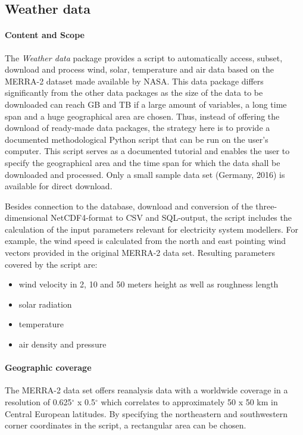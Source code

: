 \documentclass[article,sort&compress]{elsarticle}
\begin{document}
\subsection{Weather data}

\paragraph{Content and Scope}
The \textit{Weather data} package provides a script to automatically access, subset, download and process wind, solar, temperature and air data based on the MERRA-2 dataset \cite{Merra2,Rienecker2011} made available by NASA. This data package differs significantly from the other data packages as the size of the data to be downloaded can reach GB and TB if a large amount of variables, a long time span and a huge geographical area are chosen. Thus, instead of offering the download of ready-made data packages, the strategy here is to provide a documented methodological Python script that can be run on the user's computer. This script serves as a documented tutorial and enables the user to specify the geographical area and the time span for which the data shall be downloaded and processed. Only a small sample data set (Germany, 2016) is available for direct download.

Besides connection to the database, download and conversion of the three-dimensional NetCDF4-format to CSV and SQL-output, the script includes the calculation of the input parameters relevant for electricity system modellers. For example, the wind speed is calculated from the north and east pointing wind vectors provided in the original MERRA-2 data set. Resulting parameters covered by the script are:
\begin{itemize}
 \item wind velocity in 2, 10 and 50 meters height as well as roughness length
 \item solar radiation
 \item temperature
 \item air density and pressure
\end{itemize}

\paragraph{Geographic coverage}
The MERRA-2 data set offers reanalysis data with a worldwide coverage in a resolution of 0.625$^{\circ}$ x 0.5$^{\circ}$ which correlates to approximately 50 x 50 km in Central European latitudes. By specifying the northeastern and southwestern corner coordinates in the script, a rectangular area can be chosen.
\end{document}
